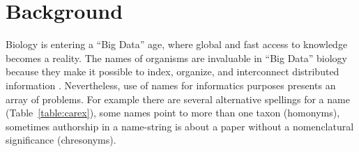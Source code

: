 \documentclass{bmcart}
\begin{document}
\section*{Background}

 Biology is entering a ``Big Data'' age, where global
and fast access to knowledge becomes a reality. The names of organisms are
invaluable in ``Big Data'' biology because they make it possible to index,
organize, and interconnect distributed information \cite{Patterson2010}.
Nevertheless, use of names for informatics purposes presents an array of
problems. For example there are several alternative spellings for a name
(Table~\ref{table:carex}), some names point to more than one taxon (homonyms),
sometimes authorship in a name-string is about a paper without a nomenclatural
significance (chresonyms).
\end{document}
